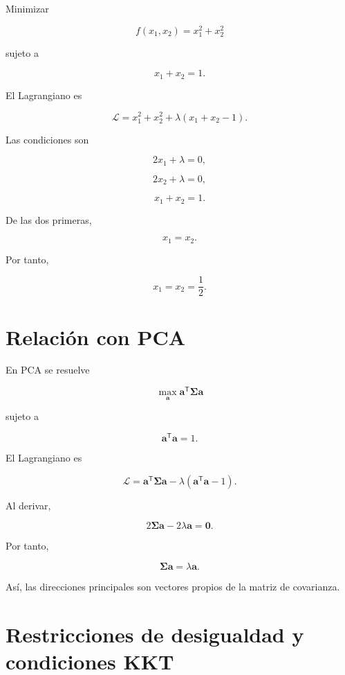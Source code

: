 \documentclass[
  spanish,
  10.5pt,
  letterpaper,
  DIV=11,
  numbers=noendperiod,
  oneside,
  open=any]{scrreprt}
\theoremstyle{definition}
\theoremstyle{definition}
\theoremstyle{plain}
\theoremstyle{remark}
\begin{document}

Minimizar

\[
f(x_1,x_2)
=
x_1^2+x_2^2
\]

sujeto a

\[
x_1+x_2=1.
\]

El Lagrangiano es

\[
\mathcal{L}
=
x_1^2+x_2^2
+
\lambda(x_1+x_2-1).
\]

Las condiciones son

\[
2x_1+\lambda=0,
\]

\[
2x_2+\lambda=0,
\]

\[
x_1+x_2=1.
\]

De las dos primeras,

\[
x_1=x_2.
\]

Por tanto,

\[
x_1=x_2=\frac{1}{2}.
\]

\section*{Relación con PCA}\label{relaciuxf3n-con-pca-2}


En PCA se resuelve

\[
\max_{\mathbf{a}}
\mathbf{a}^{\mathsf T}
\boldsymbol{\Sigma}
\mathbf{a}
\]

sujeto a

\[
\mathbf{a}^{\mathsf T}\mathbf{a}=1.
\]

El Lagrangiano es

\[
\mathcal{L}
=
\mathbf{a}^{\mathsf T}
\boldsymbol{\Sigma}
\mathbf{a}
-
\lambda
(
\mathbf{a}^{\mathsf T}\mathbf{a}-1
).
\]

Al derivar,

\[
2\boldsymbol{\Sigma}\mathbf{a}
-
2\lambda\mathbf{a}
=
\mathbf{0}.
\]

Por tanto,

\[
\boldsymbol{\Sigma}\mathbf{a}
=
\lambda\mathbf{a}.
\]

Así, las direcciones principales son vectores propios de la matriz de
covarianza.

\section*{Restricciones de desigualdad y condiciones
KKT}\label{restricciones-de-desigualdad-y-condiciones-kkt}
\end{document}
